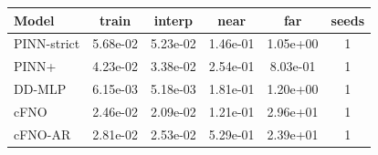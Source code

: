 \begin{tabular}{lccccc}
\toprule
Model & train & interp & near & far & seeds \\
\midrule
PINN-strict & 5.68e-02 & 5.23e-02 & 1.46e-01 & 1.05e+00 & 1 \\
PINN+ & 4.23e-02 & 3.38e-02 & 2.54e-01 & 8.03e-01 & 1 \\
DD-MLP & 6.15e-03 & 5.18e-03 & 1.81e-01 & 1.20e+00 & 1 \\
cFNO & 2.46e-02 & 2.09e-02 & 1.21e-01 & 2.96e+01 & 1 \\
cFNO-AR & 2.81e-02 & 2.53e-02 & 5.29e-01 & 2.39e+01 & 1 \\
\bottomrule
\end{tabular}
